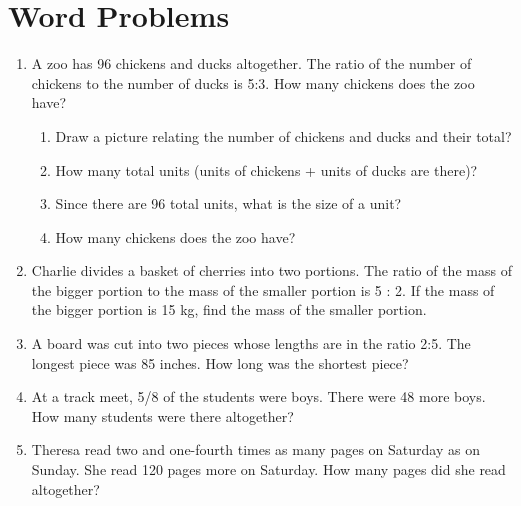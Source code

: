 \documentclass[12pt,letterpaper]{article}
\begin{document}
\section*{Word Problems}

\begin{large}
\begin{enumerate}
\item A zoo has 96 chickens and ducks altogether. The ratio of the number of chickens to the number of ducks is 5:3. How many chickens does the zoo have?

\begin{enumerate}
	\item Draw a picture relating the number of chickens and ducks and their total?

	\addvspace{0.3in}

	\item How many total units (units of chickens + units of ducks are there)?

	\addvspace{0.3in}

	\item Since there are 96 total units, what is the size of a unit?

	\addvspace{0.3in}

	\item How many chickens does the zoo have?

	\addvspace{0.3in}

\end{enumerate}

\item Charlie divides a basket of cherries into two portions. The ratio of the mass of the bigger portion to the mass of the smaller portion is 5 : 2. If the mass of the bigger portion is 15 kg, find the mass of the smaller portion.

\addvspace{0.6in}

\item A board was cut into two pieces whose lengths are in the ratio 2:5. The longest piece was 85 inches. How long was the shortest piece?

\addvspace{0.6in}

\item At a track meet, 5/8 of the students were boys. There were 48 more boys. How many students were there altogether?

\addvspace{0.6in}

\item Theresa read two and one-fourth times as many pages on Saturday as on Sunday. She read 120 pages more on Saturday. How many pages did she read altogether?

\addvspace{0.6in}

\end{enumerate}
\end{large}
\end{document}
